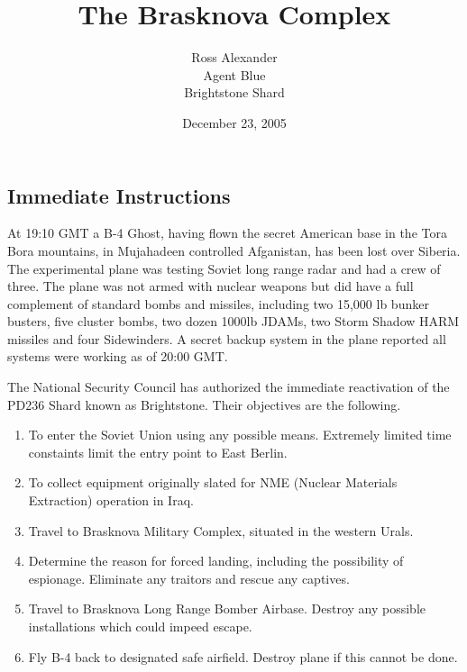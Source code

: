 \documentclass{amsart}
\title{The Brasknova Complex}
\author{Ross Alexander\\Agent Blue\\Brightstone Shard}
\date{December 23, 2005}
\begin{document}
\maketitle

\begin{multicols}{3}

\setcounter{collectmore}{10}
  
\section{Immediate Instructions}

At 19:10 GMT a B-4 Ghost, having flown the secret American base in the
Tora Bora mountains, in Mujahadeen controlled Afganistan, has been
lost over Siberia.  The experimental plane was testing Soviet long
range radar and had a crew of three.  The plane was not armed with
nuclear weapons but did have a full complement of standard bombs and
missiles, including two 15,000 lb bunker busters, five cluster bombs,
two dozen 1000lb JDAMs, two Storm Shadow HARM missiles and four
Sidewinders.  A secret backup system in the plane reported all systems
were working as of 20:00 GMT.

The National Security Council has authorized the immediate
reactivation of the PD236 Shard known as Brightstone.  Their
objectives are the following.

\begin{enumerate}

\item To enter the Soviet Union using any possible means.  Extremely
limited time constaints limit the entry point to East Berlin.

\item To collect equipment originally slated for NME (Nuclear Materials
Extraction) operation in Iraq.

\item Travel to Brasknova Military Complex, situated in the western
Urals.

\item Determine the reason for forced landing, including the
possibility of espionage.  Eliminate any traitors and rescue any
captives.

\item Travel to Brasknova Long Range Bomber Airbase.  Destroy
any possible installations which could impeed escape.

\item Fly B-4 back to designated safe airfield.  Destroy plane if this
cannot be done.


\end{enumerate}
\end{multicols}
\end{document}

